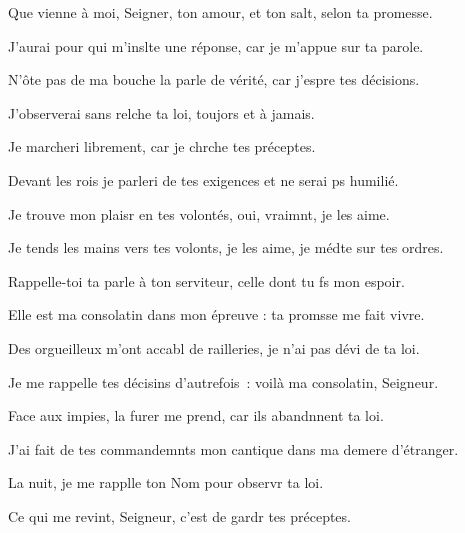 \item Que vienne à moi, Seigner, ton amour,\psstar{} et ton salt, selon ta promesse.
\item J’aurai pour qui m’inslte une réponse,\psstar{} car je m’appue sur ta parole.
\item N’ôte pas de ma bouche la parle de vérité,\psstar{} car j’espre tes décisions.
\item J’observerai sans relche ta loi,\psstar{} toujors et à jamais.
\item Je marcheri librement,\psstar{} car je chrche tes préceptes.
\item Devant les rois je parleri de tes exigences\psstar{} et ne serai ps humilié.
\item Je trouve mon plaisr en tes volontés,\psstar{} oui, vraimnt, je les aime.
\item Je tends les mains vers tes volonts, je les aime,\psstar{} je médte sur tes ordres.
\item Rappelle-toi ta parle à ton serviteur,\psstar{} celle dont tu fs mon espoir.
\item Elle est ma consolatin dans mon épreuve :\psstar{} ta promsse me fait vivre.
\item Des orgueilleux m’ont accabl de railleries,\psstar{} je n’ai pas dévi de ta loi.
\item Je me rappelle tes décisins d’autrefois :\psstar{} voilà ma consolatin, Seigneur.
\item Face aux impies, la furer me prend,\psstar{} car ils abandnnent ta loi.
\item J’ai fait de tes commandemnts mon cantique\psstar{} dans ma demere d’étranger.
\item La nuit, je me rapplle ton Nom\psstar{} pour observr ta loi.
\item Ce qui me revint, Seigneur,\psstar{} c’est de gardr tes préceptes.